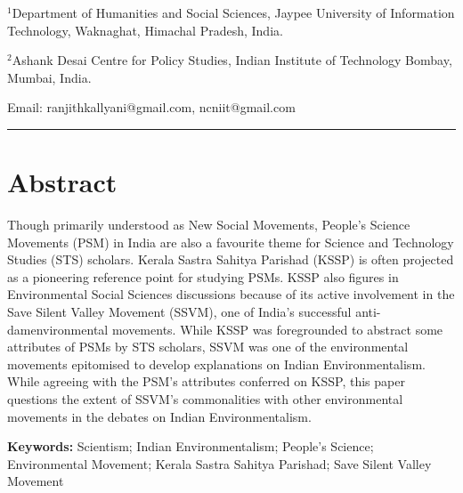 \documentclass[twoside, 13pt]{article}
\begin{document}


\maketitle
  
\chead[]{}{}


\noindent



\vspace{-.5cm}

{\fontsize{14}{16}\selectfont
$^{1}$Department of Humanities and Social Sciences, Jaypee University of Information Technology, Waknaghat, Himachal Pradesh, India.
       
$^{2}$Ashank Desai Centre for Policy Studies, Indian Institute of Technology Bombay, Mumbai, India.

Email: ranjithkallyani@gmail.com, ncniit@gmail.com }
\noindent\rule{\textwidth}{0.2mm}


\vspace{-.7cm}


{\fontsize{18}{20}\selectfont \section*{Abstract}}

\vspace{-.4cm}

{\fontsize{12}{14}\selectfont Though primarily understood as New Social Movements, People’s Science Movements (PSM) in India are also a favourite theme for Science and Technology Studies (STS) scholars. Kerala Sastra Sahitya Parishad (KSSP) is often projected as a pioneering reference point for studying PSMs. KSSP also figures in Environmental Social Sciences discussions because of its active involvement in the Save Silent Valley Movement (SSVM), one of India's successful anti-damenvironmental movements. While KSSP was foregrounded to abstract some attributes of PSMs by STS scholars, SSVM was one of the environmental movements epitomised to develop explanations on Indian Environmentalism. While agreeing with the PSM’s attributes conferred on KSSP, this paper questions the extent of SSVM’s commonalities with other environmental movements in the debates on Indian Environmentalism. 

\vspace{.2cm}

{\bfseries Keywords:} Scientism; Indian Environmentalism; People’s Science; Environmental Movement; Kerala Sastra Sahitya Parishad; Save Silent Valley Movement}
\end{document}
